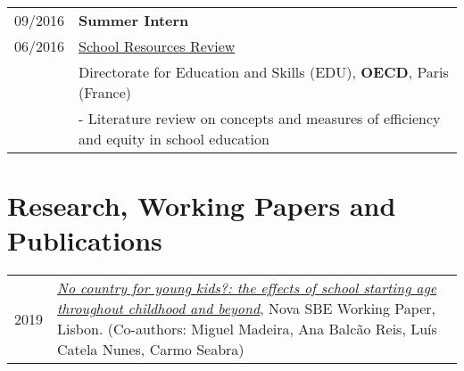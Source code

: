 \documentclass[a4paper,11pt]{article} %
\begin{document}
\begin{tabular}{r|p{13cm}}
	09/2016 & \textbf{Summer Intern} \\
	06/2016 & \href{http://www.oecd.org/education/school-resources-review/}{School Resources Review} \\ 
	& Directorate for Education and Skills (EDU), \textbf{OECD}, Paris (France) \\
	& - Literature review on concepts and measures of efficiency and equity in school education \\
\end{tabular}

\section[Research, Working Papers and Publications]{\faBook \hspace{3pt} Research, Working Papers and Publications}

\begin{tabular}{r|p{13cm}}
	2019 &  \href{https://glima93.github.io/papers/WKP_AGE.pdf}{\textit{No country for young kids?: the effects of school starting age throughout childhood and beyond}}, Nova SBE Working Paper, Lisbon. (Co-authors: Miguel Madeira, Ana Balcão Reis, Luís Catela Nunes, Carmo Seabra) \\
\end{tabular}
\end{document}
